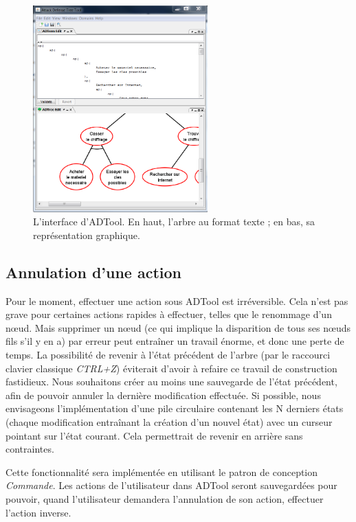 		\begin{figure}[h]
			\centering
			\includegraphics[width=0.6\textwidth]{figure/interface_adtool.png}
			\caption{L'interface d'ADTool. En haut, l'arbre au format texte ; en bas, sa représentation graphique.}
			\label{fig:int_adTool}
		\end{figure}
	
	\subsection{Annulation d'une action}	
		Pour le moment, effectuer une action sous ADTool est irréversible. Cela n'est pas grave pour certaines actions rapides à effectuer, telles que le renommage d'un nœud. Mais supprimer un nœud (ce qui implique la disparition de tous ses nœuds fils s'il y en a) par erreur peut entraîner un travail énorme, et donc une perte de temps. La possibilité de revenir à l'état précédent de l'arbre (par le raccourci clavier classique \emph{CTRL+Z}) éviterait d'avoir à refaire ce travail de construction fastidieux. Nous souhaitons créer au moins une sauvegarde de l'état précédent, afin de pouvoir annuler la dernière modification effectuée. Si possible, nous envisageons l'implémentation d'une pile circulaire contenant les N derniers états (chaque modification entraînant la création d'un nouvel état) avec un curseur pointant sur l'état courant. Cela permettrait de revenir en arrière sans contraintes. 

		Cette fonctionnalité sera implémentée en utilisant le patron de conception \emph{Commande}. Les actions de l'utilisateur dans ADTool seront sauvegardées pour pouvoir, quand l'utilisateur demandera l'annulation de son action, effectuer l'action inverse. 


